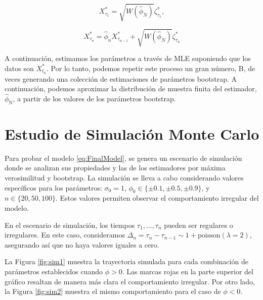 \begin{equation}
    X_{\tau_1}^* = \sqrt{W(\hat{\phi}_N)}\zeta_{\tau_1}^*, 
\end{equation}

\begin{equation}
    X_{\tau_n}^* = \hat{\phi}_{n}X_{\tau_{n-1}}^* + \sqrt{W(\hat{\phi}_N)}\zeta_{\tau_n}^*
\end{equation}

A continuación, estimamos los parámetros a través de MLE suponiendo que los datos son $X_{t_n}^*$. Por lo tanto, podemos repetir este proceso un gran número, B, de veces generando una colección de estimaciones de parámetros bootstrap. A continuación, podemos aproximar la distribución de muestra finita del estimador, $ {\hat{\phi}_{\mathrm{N}}}$, a partir de los valores de los parámetros bootstrap.

\section{Estudio de Simulación Monte Carlo}

Para probar el modelo \ref{eq:FinalModel}, se genera un escenario de simulación donde se analizan sus propiedades y las de los estimadores por máxima verosimilitud y bootstrap. La simulación se lleva a cabo considerando valores específicos para los parámetros: $\sigma_0 = 1$, $\phi_0 \in \lbrace\pm 0.1 ,\pm 0.5,\pm 0.9\rbrace$, y $n \in \lbrace20, 50, 100\rbrace$. Estos valores permiten observar el comportamiento irregular del modelo.

En el escenario de simulación, los tiempos $\tau_1 , ... , \tau_n$ pueden ser regulares o irregulares. En este caso, consideramos $\Delta_n = \tau_n - \tau_{n-1} \sim 1 + \text{poisson}(\lambda = 2)$, asegurando así que no haya valores iguales a cero.

La Figura \ref{fig:sim1} muestra la trayectoria simulada para cada combinación de parámetros establecidos cuando $\phi > 0$. Las marcas rojas en la parte superior del gráfico resaltan de manera más clara el comportamiento irregular. Por otro lado, la Figura \ref{fig:sim2} muestra el mismo comportamiento para el caso de $\phi < 0$.

